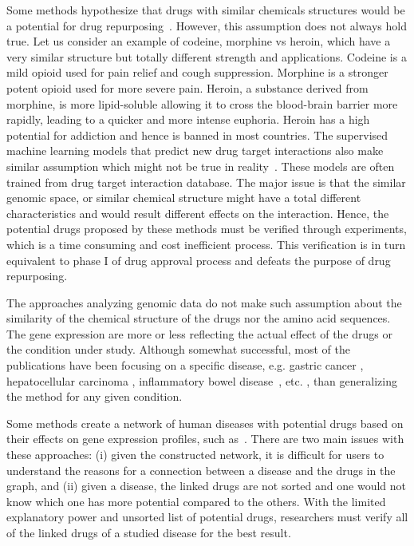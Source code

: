 Some methods hypothesize that drugs with similar chemicals structures would be a potential for drug repurposing~\cite{bleakley2009supervised, li2012new, tan2014drug}. However, this assumption does not always hold true. Let us consider an example of codeine, morphine vs heroin, which have a very similar structure but totally different strength and applications. Codeine is a mild opioid used for pain relief and cough suppression. Morphine is a stronger potent opioid used for more severe pain. Heroin, a substance derived from morphine, is more lipid-soluble allowing it to cross the blood-brain barrier more rapidly, leading to a quicker and more intense euphoria. Heroin has a high potential for addiction and hence is banned in most countries. 
The supervised machine learning models that predict new drug target interactions also make similar assumption which might not be true in reality~\cite{zheng2015large, susnow2003use, shen2003development, duvenaud2015convolutional, salt1992use}. These models are often trained from drug target interaction database. The major issue is that the similar genomic space, or similar chemical structure might have a total different characteristics and would result different effects on the interaction.
Hence, the potential drugs  proposed by these methods  must be verified through experiments, which is a time consuming and cost inefficient process. This verification is in turn equivalent to phase I of drug approval process and defeats the purpose of drug repurposing.

The approaches analyzing genomic data do not make such assumption about the similarity of the chemical structure of the drugs nor the amino acid sequences. The gene expression are more or less reflecting the actual effect of the drugs or the condition under study.
Although somewhat successful, most of the publications have been focusing on a specific disease, e.g. gastric cancer \cite{claerhout2011gene}, hepatocellular carcinoma \cite{chen2011gene},  inflammatory bowel disease~\cite{dudley2011computational}, etc. , than generalizing the method for any given condition.

Some methods create a network of human diseases with potential drugs based on their effects on gene expression profiles, such as~\cite{hu2009human, iorio2010identification, iorio2010discovery}. There are two main issues with these approaches: (i) given the constructed network, it is difficult for users to understand the reasons for a connection between a disease and the drugs in the graph, and (ii) given a disease, the linked drugs are not sorted and one would not know which one has more potential compared to the others. With the limited explanatory power and unsorted list of potential drugs, researchers must verify all of the linked drugs of a studied disease for the best result. 

